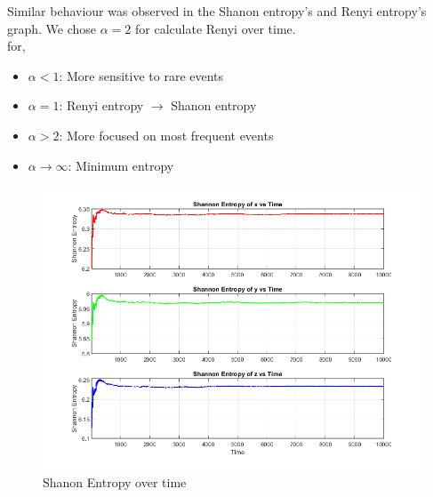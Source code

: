 \documentclass[%
reprint,
amsmath,amssymb,
aps,
floatfix,
]{revtex4-2}
\begin{document}
	\FloatBarrier
	Similar behaviour was observed in the Shanon entropy's and Renyi entropy's graph. We chose  $\alpha = 2$ for calculate Renyi over time.
	\\
	for,
	\begin{itemize}
		\item \(\alpha < 1\): More sensitive to rare events
		\item \(\alpha = 1\): Renyi entropy $\to$ Shanon entropy
		\item \(\alpha > 2\): More focused on most frequent events
		\item \(\alpha \to \infty\): Minimum entropy
	\end{itemize}
	\FloatBarrier
	\begin{figure}[htbp]
		\centering
		\includegraphics[width=0.8\linewidth]{SE_vs_time_x_y_z.png}
		\caption{Shanon Entropy over time}
		\label{SE_forx_time_series}
	\end{figure}
	
\end{document}
